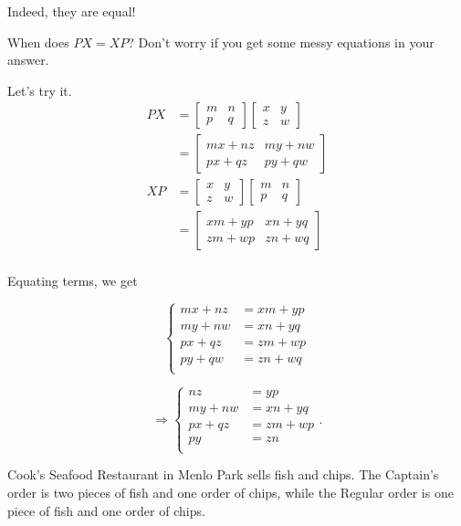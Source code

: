 \documentclass[../key.tex]{subfiles}
\begin{document}
Indeed, they are equal!

\begin{outer_problem}
\item When does $PX=XP$? Don't worry if you get some messy equations in your answer.
\end{outer_problem}

Let's try it.
\begin{align*}
PX &= \begin{bmatrix} m & n \\ p & q \end{bmatrix}\begin{bmatrix} x & y \\ z & w \end{bmatrix} \\
&= \begin{bmatrix} mx+nz & my+nw \\ px + qz & py + qw \end{bmatrix} \\
XP &= \begin{bmatrix} x & y \\ z & w \end{bmatrix} \begin{bmatrix} m & n \\ p & q \end{bmatrix} \\
&= \begin{bmatrix} xm + yp & xn + yq \\ zm + wp & zn + wq \end{bmatrix} \\
\end{align*}

Equating terms, we get

$$\begin{cases}
mx + nz &= xm + yp \\
my + nw &= xn + yq \\
px + qz &= zm + wp \\
py + qw &= zn + wq \\
\end{cases}$$

$$\Longrightarrow \begin{cases}
nz &= yp \\
my + nw &= xn + yq \\
px + qz &= zm + wp \\
py &= zn \\
\end{cases}.$$

\begin{outer_problem}
\item Cook's Seafood Restaurant in Menlo Park sells fish and chips. The Captain's order is two pieces of fish and one order of chips, while the Regular order is one piece of fish and one order of chips.
\end{outer_problem}
\end{document}
